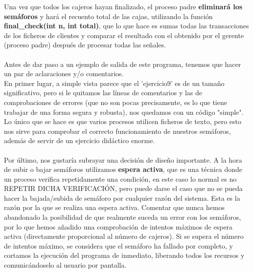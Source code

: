 \documentclass[12pt]{article}
\begin{document}
Una vez que todos los cajeros hayan finalizado, el proceso padre \textbf{eliminará los semáforos} y hará el recuento total de las cajas, utilizando la función \textbf{final\_check(int n, int total)}, que lo que hace es sumas todas las transacciones de los ficheros de clientes y comparar el resultado con el obtenido por el gerente (proceso padre) después de procesar todas las señales.\\\\
Antes de dar paso a un ejemplo de salida de este programa, tenemos que hacer un par de aclaraciones y/o comentarios.\\ En primer lugar, a simple vista parece que el 'ejercicio9' es de un tamaño significativo, pero si le quitamos las líneas de comentarios y las de comprobaciones de errores (que no son pocas precisamente, es lo que tiene trabajar de una forma segura y robusta), nos quedamos con un código "simple". Lo único que se hace es que varios procesos utilicen ficheros de texto, pero esto nos sirve para comprobar el correcto funcionamiento de nuestros semáforos, además de servir de un ejercicio didáctico enorme.\\\\
Por último, nos gustaría subrayar una decisión de diseño importante. A la hora de subir o bajar semáforos utilizamos \textbf{espera activa}, que es una técnica donde un proceso verifica repetidamente una condición, en este caso lo normal es no REPETIR DICHA VERIFICACIÓN, pero puede darse el caso que no se pueda hacer la bajada/subida de semáforo por cualquier razón del sistema. Esta es la razón por la que se realiza una espera activa. Comentar que nunca hemos abandonado la posibilidad de que realmente suceda un error con los semáforos, por lo que hemos añadido una comprobación de intentos máximos de espera activa (directamente proporcional al número de cajeros). Si se supera el número de intentos máximo, se considera que el semáforo ha fallado por completo, y cortamos la ejecución del programa de inmediato, liberando todos los recursos y comunicándoselo al usuario por pantalla.
\end{document}
